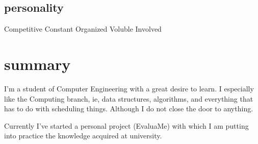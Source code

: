 \documentclass[]{friggeri-cv} %
\begin{document}
\begin{aside}
        \section{personality}
            Competitive\quad{\color{blue} $\varheartsuit\varheartsuit\varheartsuit\varheartsuit\varheartsuit\varheartsuit$}{\color{black} $ $}
            Constant\quad{\color{blue} $\varheartsuit\varheartsuit\varheartsuit\varheartsuit$}{\color{black} $\varheartsuit\varheartsuit$}
            Organized\quad{\color{blue} $\varheartsuit\varheartsuit\varheartsuit\varheartsuit$}{\color{black} $\varheartsuit\varheartsuit$}
            Voluble\quad{\color{blue} $\varheartsuit$}{\color{black} $\varheartsuit\varheartsuit\varheartsuit\varheartsuit\varheartsuit$}
            Involved\quad{\color{blue} $\varheartsuit\varheartsuit\varheartsuit\varheartsuit\varheartsuit$}{\color{black} $\varheartsuit$}
    \end{aside}




    \section{summary}

        I'm a student of Computer Engineering with a great desire to learn. I especially like the Computing branch, ie, data structures, algorithms, and everything that has to do with scheduling things. Although I do not close the door to anything.

        Currently I've started a personal project (EvaluaMe) with which I am putting into practice the knowledge acquired at university.
\end{document}
